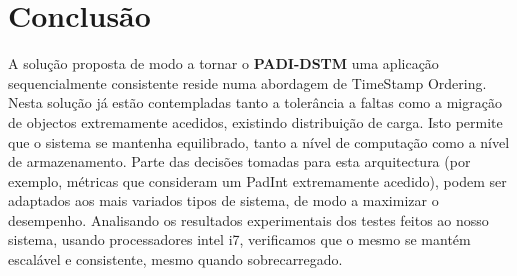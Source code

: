 \section{Conclusão}

A solução proposta de modo a tornar o \textbf{PADI-DSTM} uma aplicação sequencialmente consistente reside numa abordagem de TimeStamp Ordering\cite{ex1}. Nesta solução já estão contempladas tanto a tolerância a faltas como a migração de objectos extremamente acedidos, existindo distribuição de carga. Isto permite que o sistema se mantenha equilibrado, tanto a nível de computação como a nível de armazenamento. Parte das decisões tomadas para esta arquitectura (por exemplo, métricas que consideram um PadInt extremamente acedido), podem ser adaptados aos mais variados tipos de sistema, de modo a maximizar o desempenho. Analisando os resultados experimentais dos testes feitos ao nosso sistema, usando processadores intel i7, verificamos que o mesmo se mantém escalável e consistente, mesmo quando sobrecarregado. 
